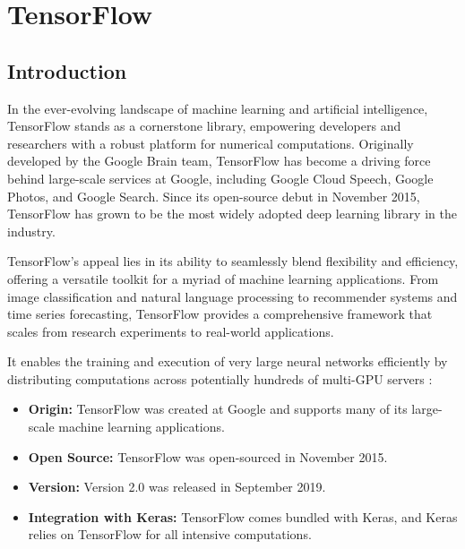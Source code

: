 %
%


\chapter{TensorFlow}


\section{Introduction}

In the ever-evolving landscape of machine learning and artificial intelligence, TensorFlow stands as a cornerstone library, empowering developers and researchers with a robust platform for numerical computations. Originally developed by the Google Brain team, TensorFlow has become a driving force behind large-scale services at Google, including Google Cloud Speech, Google Photos, and Google Search. Since its open-source debut in November 2015, TensorFlow has grown to be the most widely adopted deep learning library in the industry.

TensorFlow's appeal lies in its ability to seamlessly blend flexibility and efficiency, offering a versatile toolkit for a myriad of machine learning applications. From image classification and natural language processing to recommender systems and time series forecasting, TensorFlow provides a comprehensive framework that scales from research experiments to real-world applications.

It enables the training and execution of very large neural networks efficiently by distributing computations across potentially hundreds of multi-GPU servers \cite{Geron:2022}:

\begin{itemize}
	\item \textbf{Origin:} TensorFlow was created at Google and supports many of its large-scale machine learning applications.
	
	\item \textbf{Open Source:} TensorFlow was open-sourced in November 2015.
	
	\item \textbf{Version:} Version 2.0 was released in September 2019.
	
	\item \textbf{Integration with Keras:} TensorFlow comes bundled with Keras, and Keras relies on TensorFlow for all intensive computations.
\end{itemize}


